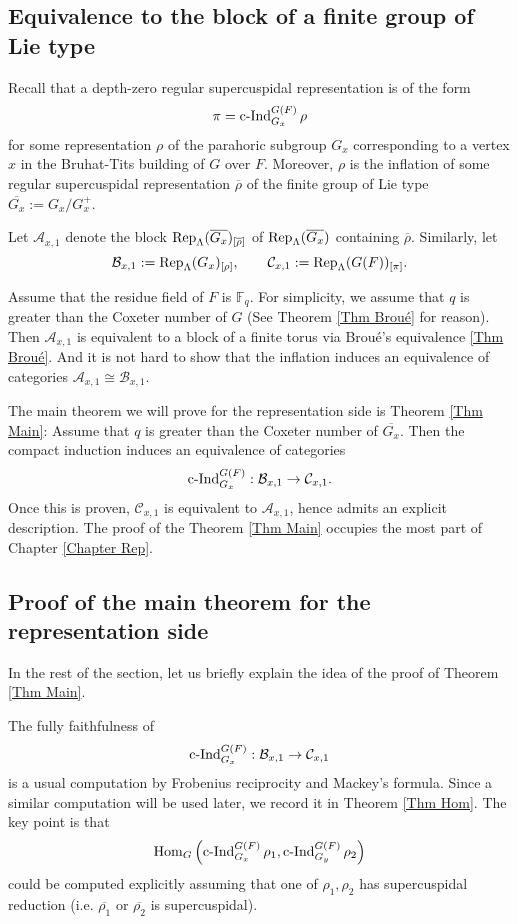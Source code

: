 \subsection{Equivalence to the block of a finite group of Lie type}

Recall that a depth-zero regular supercuspidal representation is of the form
$$\pi=\operatorname{\operatorname{c-Ind}}_{G_x}^{G(F)}\rho$$
for some representation $\rho$ of the parahoric subgroup $G_x$ corresponding to a vertex $x$ in the Bruhat-Tits building of $G$ over $F$. Moreover, $\rho$ is the inflation of some regular supercuspidal representation $\overline{\rho}$ of the finite group of Lie type $\overline{G_x}:=G_x/G_x^+$.

Let $\mathcal{A}_{x,1}$ denote the block $\operatorname{\operatorname{Rep}}_{\Lambda}(\overline{G_x})_{[\overline{\rho}]}$ of $\operatorname{\operatorname{Rep}}_{\Lambda}(\overline{G_x})$ containing $\overline{\rho}$. Similarly, let 
$$\mathcal{B}_{x,1}:=\operatorname{\operatorname{Rep}}_{\Lambda}(G_x)_{[\rho]},\qquad \mathcal{C}_{x,1}:=\operatorname{\operatorname{Rep}}_{\Lambda}(G(F))_{[\pi]}.$$

Assume that the residue field of $F$ is $\mathbb{F}_q$. For simplicity, we assume that $q$ is greater than the Coxeter number of $G$ (See Theorem \ref{Thm Broué} for reason). Then $\mathcal{A}_{x,1}$ is equivalent to a block of a finite torus via Broué's equivalence \ref{Thm Broué}. And it is not hard to show that the inflation induces an equivalence of categories $\mathcal{A}_{x,1} \cong \mathcal{B}_{x,1}$.

The main theorem we will prove for the representation side is Theorem \ref{Thm Main}: Assume that $q$ is greater than the Coxeter number of $\overline{G_x}$. Then the compact induction induces an equivalence of categories
$$\operatorname{\operatorname{c-Ind}}_{G_x}^{G(F)}: \mathcal{B}_{x,1} \to \mathcal{C}_{x,1}.$$
Once this is proven, $\mathcal{C}_{x,1}$ is equivalent to $\mathcal{A}_{x,1}$, hence admits an explicit description. The proof of the Theorem \ref{Thm Main} occupies the most part of Chapter \ref{Chapter Rep}. 

\subsection{Proof of the main theorem for the representation side}

In the rest of the section, let us briefly explain the idea of the proof of Theorem \ref{Thm Main}.

The fully faithfulness of 
$$\operatorname{\operatorname{c-Ind}}_{G_x}^{G(F)}: \mathcal{B}_{x,1} \to \mathcal{C}_{x,1}$$
is a usual computation by Frobenius reciprocity and Mackey's formula. Since a similar computation will be used later, we record it in Theorem \ref{Thm Hom}. The key point is that 
$$\operatorname{\operatorname{Hom}}_G\left(\operatorname{\operatorname{c-Ind}}_{G_x}^{G(F)}\rho_1, \operatorname{\operatorname{c-Ind}}_{G_y}^{G(F)}\rho_2\right)$$
could be computed explicitly assuming that one of $\rho_1, \rho_2$ has supercuspidal reduction (i.e. $\overline{\rho_1}$ or $\overline{\rho_2}$ is supercuspidal). 

